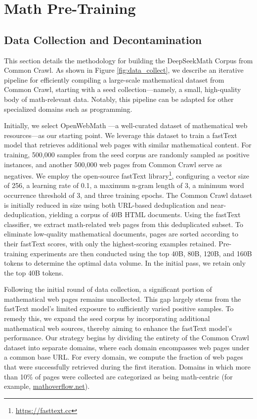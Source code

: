 \section{Math Pre-Training}

\subsection{Data Collection and Decontamination} 

This section details the methodology for building the DeepSeekMath Corpus from Common Crawl. As shown in Figure \ref{fig:data_collect}, we describe an iterative pipeline for efficiently compiling a large-scale mathematical dataset from Common Crawl, starting with a seed collection—namely, a small, high-quality body of math-relevant data. Notably, this pipeline can be adapted for other specialized domains such as programming.

Initially, we select OpenWebMath \citep{openwebmath}—a well-curated dataset of mathematical web resources—as our starting point. We leverage this dataset to train a fastText model \citep{joulin2016fasttext} that retrieves additional web pages with similar mathematical content. For training, 500,000 samples from the seed corpus are randomly sampled as positive instances, and another 500,000 web pages from Common Crawl serve as negatives. We employ the open-source fastText library\footnote{\url{https://fasttext.cc}}, configuring a vector size of 256, a learning rate of 0.1, a maximum n-gram length of 3, a minimum word occurrence threshold of 3, and three training epochs. The Common Crawl dataset is initially reduced in size using both URL-based deduplication and near-deduplication, yielding a corpus of 40B HTML documents. Using the fastText classifier, we extract math-related web pages from this deduplicated subset. To eliminate low-quality mathematical documents, pages are sorted according to their fastText scores, with only the highest-scoring examples retained. Pre-training experiments are then conducted using the top 40B, 80B, 120B, and 160B tokens to determine the optimal data volume. In the initial pass, we retain only the top 40B tokens.

Following the initial round of data collection, a significant portion of mathematical web pages remains uncollected. This gap largely stems from the fastText model’s limited exposure to sufficiently varied positive samples. To remedy this, we expand the seed corpus by incorporating additional mathematical web sources, thereby aiming to enhance the fastText model’s performance. Our strategy begins by dividing the entirety of the Common Crawl dataset into separate domains, where each domain encompasses web pages under a common base URL. For every domain, we compute the fraction of web pages that were successfully retrieved during the first iteration. Domains in which more than 10\% of pages were collected are categorized as being math-centric (for example, \url{mathoverflow.net}).

